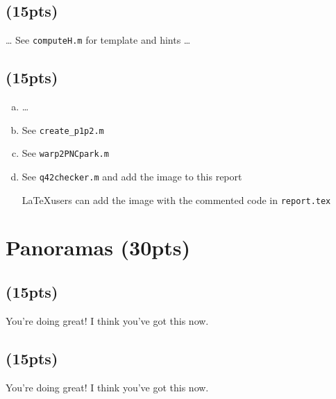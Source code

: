 \documentclass[12pt]{article}
\begin{document}
\subsection{(15pts)}

\ldots
See {\tt computeH.m} for template and hints
\ldots

\subsection{(15pts)}

\begin{enumerate}[a)]
\item \ldots
\item See {\tt create\_p1p2.m}
\item See {\tt warp2PNCpark.m}
\item See {\tt q42checker.m} and add the image to this report

  \LaTeX users can add the image with the commented code in {\tt report.tex}


\end{enumerate}

\section{Panoramas (30pts)}

\subsection{(15pts)}

You're doing great! I think you've got this now.

\subsection{(15pts)}

You're doing great! I think you've got this now.
\end{document}
